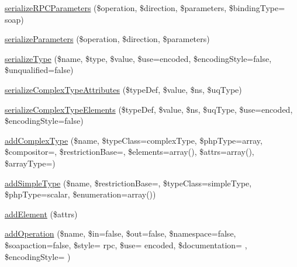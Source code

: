 \begin{DoxyCompactItemize}
\item 
\hyperlink{classwsdl_a20b71dab3c8c6bdad9abb9490a38a48f}{serialize\+R\+P\+C\+Parameters} (\$operation, \$direction, \$parameters, \$binding\+Type= \textquotesingle{}soap\textquotesingle{})
\item 
\hyperlink{classwsdl_afed507a7c4d2b216e27515ca9181361c}{serialize\+Parameters} (\$operation, \$direction, \$parameters)
\item 
\hyperlink{classwsdl_a06a97e7bc4c0fe43b1193177d3266c30}{serialize\+Type} (\$name, \$type, \$value, \$use=\textquotesingle{}encoded\textquotesingle{}, \$encoding\+Style=false, \$unqualified=false)
\item 
\hyperlink{classwsdl_a1bebf04c625f86d2c65c6a2fc4c69f52}{serialize\+Complex\+Type\+Attributes} (\$type\+Def, \$value, \$ns, \$uq\+Type)
\item 
\hyperlink{classwsdl_a9abd63b860271a2010c4d35b5c607b45}{serialize\+Complex\+Type\+Elements} (\$type\+Def, \$value, \$ns, \$uq\+Type, \$use=\textquotesingle{}encoded\textquotesingle{}, \$encoding\+Style=false)
\item 
\hyperlink{classwsdl_a8086789ccd44f879ab77ba98dfa08aa2}{add\+Complex\+Type} (\$name, \$type\+Class=\textquotesingle{}complex\+Type\textquotesingle{}, \$php\+Type=\textquotesingle{}array\textquotesingle{}, \$compositor=\textquotesingle{}\textquotesingle{}, \$restriction\+Base=\textquotesingle{}\textquotesingle{}, \$elements=array(), \$attrs=array(), \$array\+Type=\textquotesingle{}\textquotesingle{})
\item 
\hyperlink{classwsdl_a31228a55d8cdb602e32f481406e7455c}{add\+Simple\+Type} (\$name, \$restriction\+Base=\textquotesingle{}\textquotesingle{}, \$type\+Class=\textquotesingle{}simple\+Type\textquotesingle{}, \$php\+Type=\textquotesingle{}scalar\textquotesingle{}, \$enumeration=array())
\item 
\hyperlink{classwsdl_a7341d393047f63fdcb50dd44d2eff448}{add\+Element} (\$attrs)
\item 
\hyperlink{classwsdl_a629076bad717a1ef68261afe210001fc}{add\+Operation} (\$name, \$in=false, \$out=false, \$namespace=false, \$soapaction=false, \$style= \textquotesingle{}rpc\textquotesingle{}, \$use= \textquotesingle{}encoded\textquotesingle{}, \$documentation= \textquotesingle{}\textquotesingle{}, \$encoding\+Style= \textquotesingle{}\textquotesingle{})
\end{DoxyCompactItemize}
